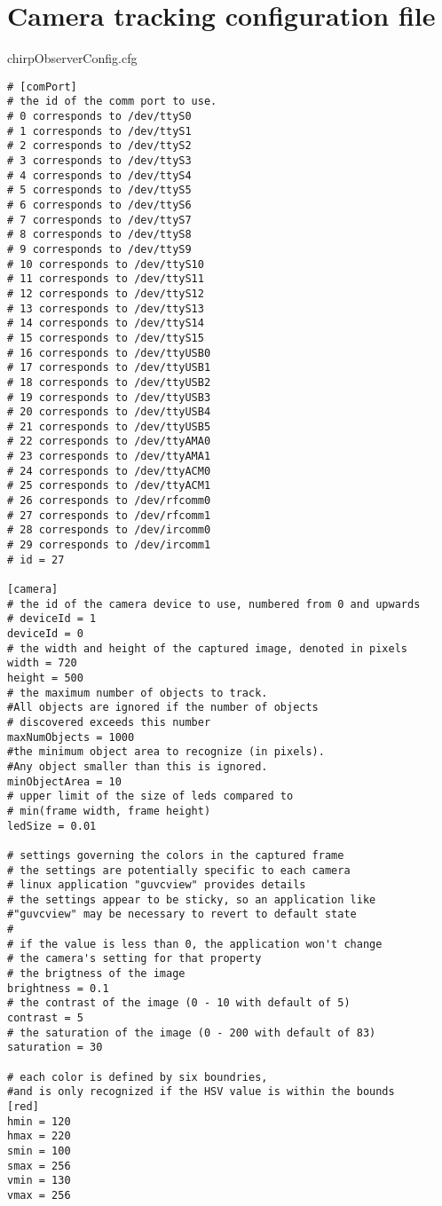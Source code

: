 \chapter{Camera tracking configuration file}
\label{app:opencvcfg}
chirpObserverConfig.cfg
\begin{lstlisting}
# [comPort]
# the id of the comm port to use. 
# 0 corresponds to /dev/ttyS0 
# 1 corresponds to /dev/ttyS1
# 2 corresponds to /dev/ttyS2
# 3 corresponds to /dev/ttyS3
# 4 corresponds to /dev/ttyS4
# 5 corresponds to /dev/ttyS5
# 6 corresponds to /dev/ttyS6
# 7 corresponds to /dev/ttyS7
# 8 corresponds to /dev/ttyS8
# 9 corresponds to /dev/ttyS9
# 10 corresponds to /dev/ttyS10
# 11 corresponds to /dev/ttyS11
# 12 corresponds to /dev/ttyS12
# 13 corresponds to /dev/ttyS13
# 14 corresponds to /dev/ttyS14
# 15 corresponds to /dev/ttyS15
# 16 corresponds to /dev/ttyUSB0
# 17 corresponds to /dev/ttyUSB1
# 18 corresponds to /dev/ttyUSB2
# 19 corresponds to /dev/ttyUSB3
# 20 corresponds to /dev/ttyUSB4
# 21 corresponds to /dev/ttyUSB5
# 22 corresponds to /dev/ttyAMA0
# 23 corresponds to /dev/ttyAMA1
# 24 corresponds to /dev/ttyACM0
# 25 corresponds to /dev/ttyACM1
# 26 corresponds to /dev/rfcomm0
# 27 corresponds to /dev/rfcomm1
# 28 corresponds to /dev/ircomm0
# 29 corresponds to /dev/ircomm1
# id = 27

[camera]
# the id of the camera device to use, numbered from 0 and upwards
# deviceId = 1
deviceId = 0
# the width and height of the captured image, denoted in pixels
width = 720	
height = 500
# the maximum number of objects to track. 
#All objects are ignored if the number of objects
# discovered exceeds this number
maxNumObjects = 1000
#the minimum object area to recognize (in pixels). 
#Any object smaller than this is ignored.
minObjectArea = 10
# upper limit of the size of leds compared to 
# min(frame width, frame height)
ledSize = 0.01

# settings governing the colors in the captured frame
# the settings are potentially specific to each camera
# linux application "guvcview" provides details
# the settings appear to be sticky, so an application like 
#"guvcview" may be necessary to revert to default state
#
# if the value is less than 0, the application won't change
# the camera's setting for that property
# the brigtness of the image
brightness = 0.1
# the contrast of the image (0 - 10 with default of 5)
contrast = 5
# the saturation of the image (0 - 200 with default of 83)
saturation = 30

# each color is defined by six boundries,
#and is only recognized if the HSV value is within the bounds
[red]
hmin = 120
hmax = 220
smin = 100
smax = 256
vmin = 130
vmax = 256


\end{lstlisting}
